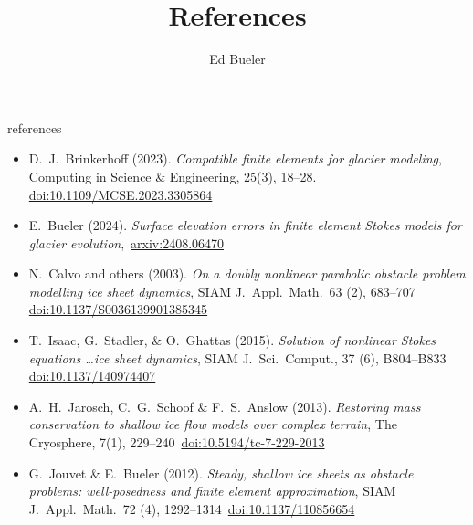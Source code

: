 \documentclass[10pt,dvipsnames]{beamer}
\title{References}
\date{}
\author{Ed Bueler}
\newcommand{\sdoi}[1]{\,{\scriptsize \href{https://doi.org/#1}{doi:#1}}}
\newcommand{\surl}[2]{\,{\scriptsize \href{#1}{#2}}}
\begin{document}
\graphicspath{{figs/}{../NWG24/figs/}{../../paper/figs/}}


\begin{frame}[noframenumbering]{references}

\scriptsize

\begin{itemize}
\item D.~J.~Brinkerhoff (2023). \emph{Compatible finite elements for glacier modeling}, Computing in Science \& Engineering, 25(3), 18--28. \sdoi{10.1109/MCSE.2023.3305864}
\item E.~Bueler (2024). \emph{Surface elevation errors in finite element {S}tokes models for glacier evolution}, \surl{https://arxiv.org/abs/2408.06470}{arxiv:2408.06470}
\item N.~Calvo and others (2003). \emph{On a doubly nonlinear parabolic obstacle problem modelling ice sheet dynamics}, SIAM J.~Appl.~Math.~63 (2), 683--707 \sdoi{10.1137/S0036139901385345}
\item T.~Isaac, G.~Stadler, \& O.~Ghattas (2015). \emph{Solution of nonlinear Stokes equations \dots ice sheet dynamics}, SIAM J.~Sci.~Comput., 37 (6), B804--B833 \sdoi{10.1137/140974407}
\item A.~H.~Jarosch, C.~G.~Schoof \& F.~S.~Anslow (2013). \emph{Restoring mass conservation to shallow ice flow models over complex terrain}, The Cryosphere, 7(1), 229--240 \sdoi{10.5194/tc-7-229-2013}
\item G.~Jouvet \& E.~Bueler (2012). \emph{Steady, shallow ice sheets as obstacle problems: well-posedness and finite element approximation}, SIAM J.~Appl.~Math.~72 (4), 1292--1314 \sdoi{10.1137/110856654}

\end{itemize}
\end{frame}
\end{document}
